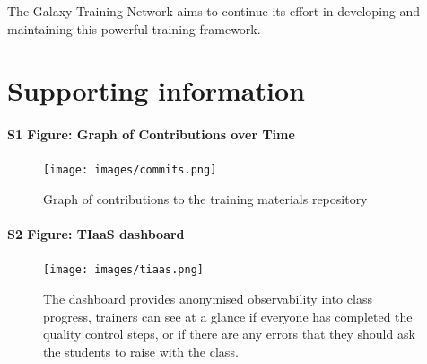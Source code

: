 \documentclass[10pt,letterpaper]{article}
\begin{document}
The Galaxy Training Network aims to continue its effort in developing and maintaining this powerful training framework.

\section*{Supporting information}


\clearpage
\paragraph{S1 Figure: Graph of Contributions over Time}
\begin{figure}[!ht]
	\centering
	\texttt{[image: images/commits.png]}
	\caption{Graph of contributions to the training materials repository\label{fig:contributions}}
\end{figure}

\clearpage
\paragraph{S2 Figure: TIaaS dashboard}
\begin{figure}[!ht]
	\centering
	\texttt{[image: images/tiaas.png]}
	\caption{The dashboard provides anonymised observability into class progress, trainers can see at a glance if everyone has completed the quality control steps, or if there are any errors that they should ask the students to raise with the class.\label{fig:tiaas-dashboard}}
\end{figure}

\clearpage
\end{document}
